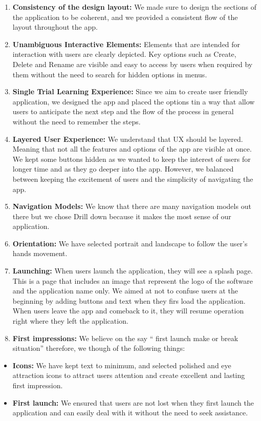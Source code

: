 \documentclass{article}
\begin{document}
\begin{enumerate}
\item \textbf{Consistency of the design layout:} We made sure to design the sections of the application to be coherent, and we provided a consistent flow of the layout throughout the app.
\item \textbf{Unambiguous Interactive Elements:} Elements that are intended for interaction with users are clearly depicted. Key options such as Create, Delete and Rename are visible and easy to access by users when required by them without the need to search for hidden options in menus.
\item \textbf{Single Trial Learning Experience:}  Since we aim to create user friendly application, we designed the app and placed the options tin a way that allow users to anticipate the next step and the flow of the process in general without the need to remember the steps.
\item \textbf{Layered User Experience:} We understand that UX should be layered. Meaning that not all the features and options of the app are visible at once. We kept some buttons hidden as we wanted to keep the interest of users for longer time and as they go deeper into the app. However, we balanced between keeping the excitement of users and the simplicity of navigating the app.
\item \textbf{Navigation Models:} We know that there are many navigation models out there but we chose Drill down because it makes the most sense of our application.
\item \textbf{Orientation:} We have selected portrait and landscape to follow the user's hands movement.
\item \textbf{Launching:} When users launch the application, they will see a splash page. This is a page that includes an image that represent the logo of the software and the application name only. We aimed at not to confuse users at the beginning by adding buttons and text when they firs load the application. When users leave the app and comeback to it, they will resume operation right where they left the application.
\item \textbf{First impressions:} We believe on the say “ first launch make or break situation” therefore, we though of the following things:
\end{enumerate}
\begin{itemize}
\item \textbf{Icons:} We have kept text to minimum, and selected polished and eye attraction icons to attract users attention and create excellent and lasting first impression.
\item \textbf{First launch:} We ensured that users are not lost when they first launch the application and can easily deal with it without the need to seek assistance.
\end{itemize}
\end{document}
